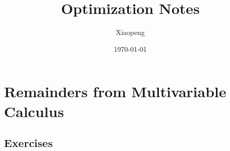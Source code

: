 \documentclass[a4paper, 12pt]{article}
\begin{document}
\title{Optimization Notes}
\author{Xiaopeng}
\date{\today}

\maketitle

\section{Remainders from Multivariable Calculus}


\subsection{Exercises}

\end{document}
